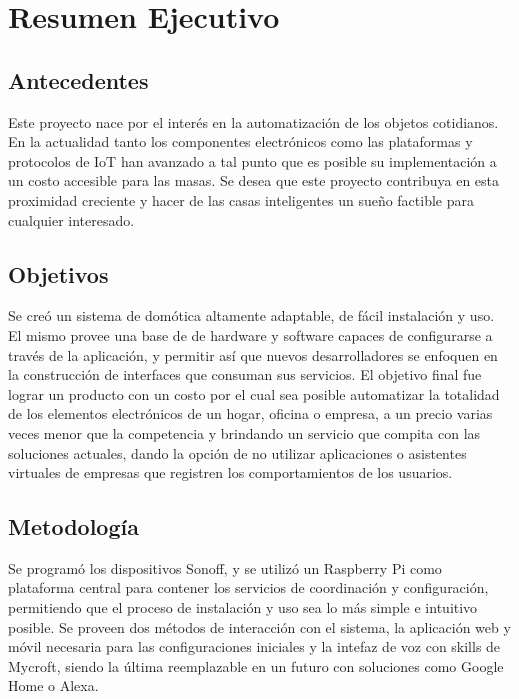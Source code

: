 \chapter{Resumen Ejecutivo}

\section{Antecedentes}

Este proyecto nace por el interés en la automatización de los objetos cotidianos. En la actualidad tanto los componentes electrónicos como las plataformas y protocolos de IoT han avanzado a tal punto que es posible su implementación a un costo accesible para las masas. Se desea que este proyecto contribuya en esta proximidad creciente y hacer de las casas inteligentes un sueño factible para cualquier interesado.

\section{Objetivos}

Se creó un sistema de domótica altamente adaptable, de fácil instalación y uso. El mismo provee una base de de hardware y software capaces de configurarse a través de la aplicación, y permitir así que nuevos desarrolladores se enfoquen en la construcción de interfaces que consuman sus servicios. El objetivo final fue lograr un producto con un costo por el cual sea posible automatizar la totalidad de los elementos electrónicos de un hogar, oficina o empresa, a un precio varias veces menor que la competencia y brindando un servicio que compita con las soluciones actuales, dando la opción de no utilizar aplicaciones o asistentes virtuales de empresas que registren los comportamientos de los usuarios.

\section{Metodología}

Se programó los dispositivos Sonoff, y se utilizó un Raspberry Pi como plataforma central para contener los servicios de coordinación y configuración, permitiendo que el proceso de instalación y uso sea lo más simple e intuitivo posible. Se proveen dos métodos de interacción con el sistema, la aplicación web y móvil necesaria para las configuraciones iniciales y la intefaz de voz con skills de Mycroft, siendo la última reemplazable en un futuro con soluciones como Google Home o Alexa. 

